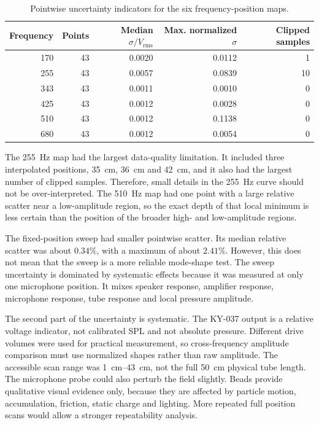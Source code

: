 \documentclass[11pt,a4paper]{article}
\newcommand{\rms}{V_{\mathrm{rms}}}
\begin{document}
\begin{table}[H]
  \centering
  \caption{Pointwise uncertainty indicators for the six frequency-position maps.}
  \begin{tabular}{rrrrr}
    \toprule
    Frequency & Points & Median \(\sigma/\rms\) & Max. normalized \(\sigma\) & Clipped samples \\
    \midrule
    170 & 43 & 0.0020 & 0.0112 & 1 \\
    255 & 43 & 0.0057 & 0.0839 & 10 \\
    343 & 43 & 0.0011 & 0.0010 & 0 \\
    425 & 43 & 0.0012 & 0.0028 & 0 \\
    510 & 43 & 0.0012 & 0.1138 & 0 \\
    680 & 43 & 0.0012 & 0.0054 & 0 \\
    \bottomrule
  \end{tabular}
\end{table}

The \SI{255}{Hz} map had the largest data-quality limitation. It included three interpolated positions, \SI{35}{cm}, \SI{36}{cm} and \SI{42}{cm}, and it also had the largest number of clipped samples. Therefore, small details in the \SI{255}{Hz} curve should not be over-interpreted. The \SI{510}{Hz} map had one point with a large relative scatter near a low-amplitude region, so the exact depth of that local minimum is less certain than the position of the broader high- and low-amplitude regions.

The fixed-position sweep had smaller pointwise scatter. Its median relative scatter was about \(0.34\%\), with a maximum of about \(2.41\%\). However, this does not mean that the sweep is a more reliable mode-shape test. The sweep uncertainty is dominated by systematic effects because it was measured at only one microphone position. It mixes speaker response, amplifier response, microphone response, tube response and local pressure amplitude.

The second part of the uncertainty is systematic. The KY-037 output is a relative voltage indicator, not calibrated SPL and not absolute pressure. Different drive volumes were used for practical measurement, so cross-frequency amplitude comparison must use normalized shapes rather than raw amplitude. The accessible scan range was \SIrange{1}{43}{cm}, not the full \SI{50}{cm} physical tube length. The microphone probe could also perturb the field slightly. Beads provide qualitative visual evidence only, because they are affected by particle motion, accumulation, friction, static charge and lighting. More repeated full position scans would allow a stronger repeatability analysis.
\end{document}

